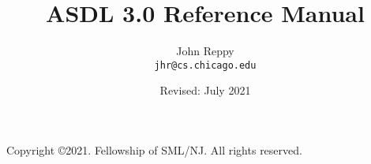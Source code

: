 \documentclass[11pt,letterpaper]{book}
\title{ASDL 3.0 Reference Manual}
\author{
  John Reppy\\
  \texttt{jhr@cs.chicago.edu}}
\date{Revised: July 2021}
\begin{document}
\frontmatter

\maketitle

\phantom{.}

\noindent Copyright \copyright{}2021.  Fellowship of SML/NJ.  All rights reserved.

\vskip 12pt

\pagebreak

\tableofcontents

\mainmatter


\newpage


%
%




%



\backmatter



\end{document}
